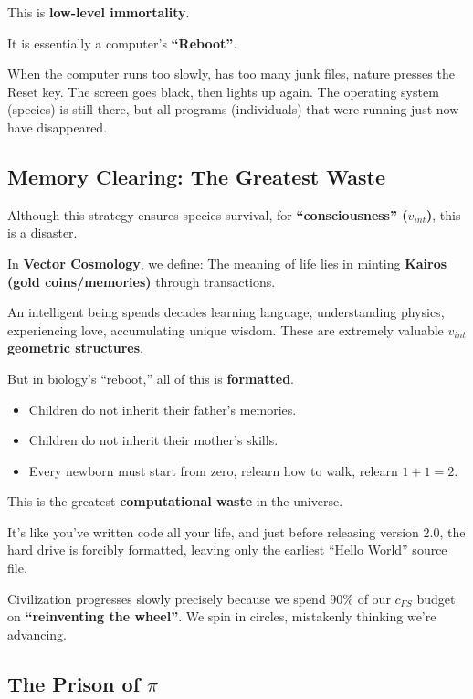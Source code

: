 This is \textbf{low-level immortality}.

It is essentially a computer's \textbf{``Reboot''}.

When the computer runs too slowly, has too many junk files, nature presses the Reset key. The screen goes black, then lights up again. The operating system (species) is still there, but all programs (individuals) that were running just now have disappeared.

\subsection{Memory Clearing: The Greatest Waste}

Although this strategy ensures species survival, for \textbf{``consciousness'' ($v_{int}$)}, this is a disaster.

In \textbf{Vector Cosmology}, we define: The meaning of life lies in minting \textbf{Kairos (gold coins/memories)} through transactions.

An intelligent being spends decades learning language, understanding physics, experiencing love, accumulating unique wisdom. These are extremely valuable \textbf{$v_{int}$ geometric structures}.

But in biology's ``reboot,'' all of this is \textbf{formatted}.

\begin{itemize}
\item Children do not inherit their father's memories.

\item Children do not inherit their mother's skills.

\item Every newborn must start from zero, relearn how to walk, relearn $1+1=2$.
\end{itemize}

This is the greatest \textbf{computational waste} in the universe.

It's like you've written code all your life, and just before releasing version 2.0, the hard drive is forcibly formatted, leaving only the earliest ``Hello World'' source file.

Civilization progresses slowly precisely because we spend 90\% of our $c_{FS}$ budget on \textbf{``reinventing the wheel''}. We spin in circles, mistakenly thinking we're advancing.

\subsection{The Prison of $\pi$}

